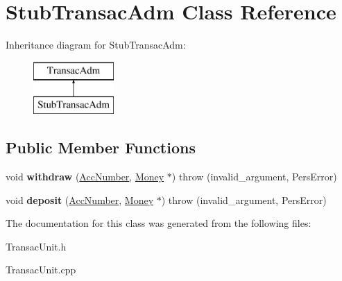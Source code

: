 \hypertarget{classStubTransacAdm}{\section{Stub\-Transac\-Adm Class Reference}
\label{d9/d0f/classStubTransacAdm}
}
Inheritance diagram for Stub\-Transac\-Adm\-:\begin{figure}[H]
\begin{center}
\leavevmode
\includegraphics[height=2.000000cm]{d9/d0f/classStubTransacAdm}
\end{center}
\end{figure}
\subsection*{Public Member Functions}
\begin{DoxyCompactItemize}
\item 
\hypertarget{classStubTransacAdm_aa411e937e159c26aa50901aad504db42}{void {\bfseries withdraw} (\hyperlink{classAccNumber}{Acc\-Number}, \hyperlink{classMoney}{Money} $\ast$)  throw (invalid\-\_\-argument, Pers\-Error)}\label{d9/d0f/classStubTransacAdm_aa411e937e159c26aa50901aad504db42}

\item 
\hypertarget{classStubTransacAdm_afc25824382e5ce8cd491a573b557bbc1}{void {\bfseries deposit} (\hyperlink{classAccNumber}{Acc\-Number}, \hyperlink{classMoney}{Money} $\ast$)  throw (invalid\-\_\-argument, Pers\-Error)}\label{d9/d0f/classStubTransacAdm_afc25824382e5ce8cd491a573b557bbc1}

\end{DoxyCompactItemize}


The documentation for this class was generated from the following files\-:\begin{DoxyCompactItemize}
\item 
Transac\-Unit.\-h\item 
Transac\-Unit.\-cpp\end{DoxyCompactItemize}
